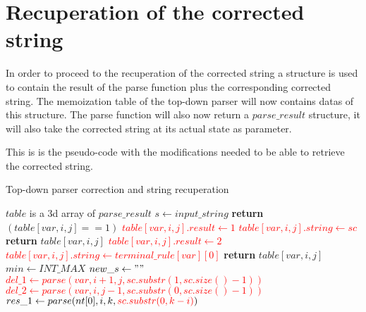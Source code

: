 \section{Recuperation of the corrected string}

In order to proceed to the recuperation of the corrected string a structure is used to contain the result of the parse function plus the corresponding corrected string.
The memoization table of the top-down parser will now contains datas of this structure.
The parse function will also now return a $parse\_result$ structure, it will also take the corrected string at its actual state as parameter.

This is is the pseudo-code with the modifications needed to be able to retrieve the corrected string.

\FloatBarrier
\begin{algorithm}
    \caption{Top-down parser correction and string recuperation}
    \label{parse}
    \begin{algorithmic}[1]
        \State $table$ is a 3d array of $parse\_result$
        \State $s \gets input\_string$
         
                \State \textbf{return} $(table[var, i, j] == 1)$
            \EndIf
                        \State \textcolor{red}{$table[var, i, j].result \gets 1$}
                        \State \textcolor{red}{$table[var, i, j].string \gets sc$}
                        \State \textbf{return} $table[var, i, j]$
                    \EndIf
                \EndFor
                    \State \textcolor{red}{$table[var, i, j].result \gets 2$}
                    \State \textcolor{red}{$table[var, i, j].string \gets terminal\_rule[var][0]$}
                    \State \textbf{return} $table[var, i, j]$
                \EndIf
            \Else
                \State $min \gets INT\_MAX$
                \State \textcolor{red}{$new\_s \gets ""$}
                \State \textcolor{red}{$del\_1 \gets parse(var, i + 1, j, sc.substr(1, sc.size() - 1))$}
                \State \textcolor{red}{$del\_2 \gets parse(var, i, j - 1, sc.substr(0, sc.size() - 1))$}
                        \State $res\_1 \gets parse(nt[0], i, k, \textcolor{red}{sc.substr(0, k - i)})$

\end{algorithmic}
\end{algorithm}
